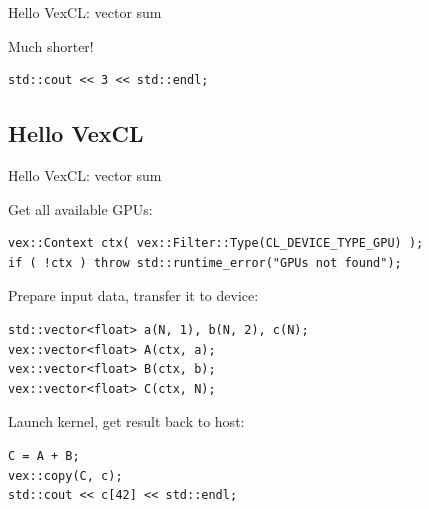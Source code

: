 \documentclass[@BEAMER_OPTIONS@]{beamer}
\begin{document}

\begin{frame}[fragile]{Hello VexCL: vector sum}
    \begin{exampleblock}{Much shorter!}
        \begin{lstlisting}
std::cout << 3 << std::endl;
        \end{lstlisting}
    \end{exampleblock}
\end{frame}

\note[itemize]{ }

\subsection{Hello VexCL}

\begin{frame}[fragile]{Hello VexCL: vector sum}
    \begin{exampleblock}{Get all available GPUs:}
        \begin{lstlisting}
vex::Context ctx( vex::Filter::Type(CL_DEVICE_TYPE_GPU) );
if ( !ctx ) throw std::runtime_error("GPUs not found");
        \end{lstlisting}
    \end{exampleblock}
    \begin{exampleblock}{Prepare input data, transfer it to device:}
        \begin{lstlisting}[firstnumber=last]
std::vector<float> a(N, 1), b(N, 2), c(N);
vex::vector<float> A(ctx, a);
vex::vector<float> B(ctx, b);
vex::vector<float> C(ctx, N);
        \end{lstlisting}
    \end{exampleblock}
    \begin{exampleblock}{Launch kernel, get result back to host:}
        \begin{lstlisting}[firstnumber=last]
C = A + B;
vex::copy(C, c);
std::cout << c[42] << std::endl;
        \end{lstlisting}
    \end{exampleblock}
\end{frame}
\end{document}
